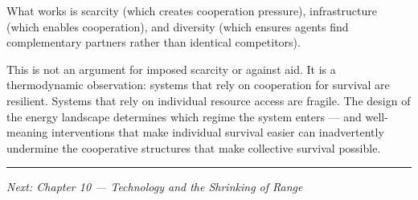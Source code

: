 What works is scarcity (which creates cooperation pressure), infrastructure (which enables cooperation), and diversity (which ensures agents find complementary partners rather than identical competitors).

This is not an argument for imposed scarcity or against aid. It is a thermodynamic observation: systems that rely on cooperation for survival are resilient. Systems that rely on individual resource access are fragile. The design of the energy landscape determines which regime the system enters --- and well-meaning interventions that make individual survival easier can inadvertently undermine the cooperative structures that make collective survival possible.

\begin{center}\rule{0.5\linewidth}{0.5pt}\end{center}

\emph{Next: Chapter 10 --- Technology and the Shrinking of Range}
